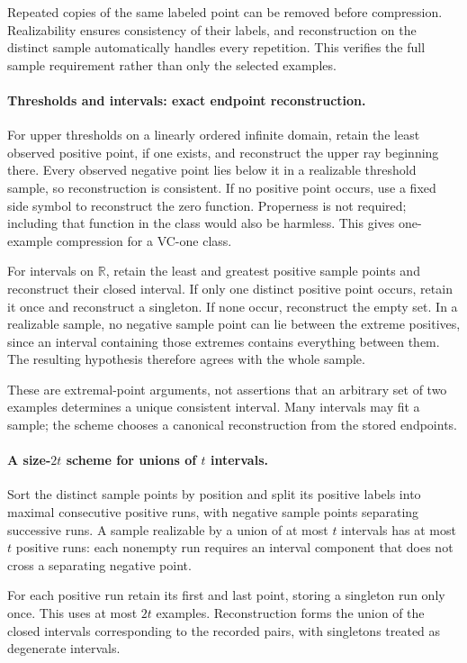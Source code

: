 \documentclass[11pt]{article}
\begin{document}
Repeated copies of the same labeled point can be removed before compression. Realizability ensures consistency of their labels, and reconstruction on the distinct sample automatically handles every repetition. This verifies the full sample requirement rather than only the selected examples.

\paragraph{Thresholds and intervals: exact endpoint reconstruction.}
For upper thresholds on a linearly ordered infinite domain, retain the least observed positive point, if one exists, and reconstruct the upper ray beginning there. Every observed negative point lies below it in a realizable threshold sample, so reconstruction is consistent. If no positive point occurs, use a fixed side symbol to reconstruct the zero function. Properness is not required; including that function in the class would also be harmless. This gives one-example compression for a VC-one class.

For intervals on $\mathbb R$, retain the least and greatest positive sample points and reconstruct their closed interval. If only one distinct positive point occurs, retain it once and reconstruct a singleton. If none occur, reconstruct the empty set. In a realizable sample, no negative sample point can lie between the extreme positives, since an interval containing those extremes contains everything between them. The resulting hypothesis therefore agrees with the whole sample.

These are extremal-point arguments, not assertions that an arbitrary set of two examples determines a unique consistent interval. Many intervals may fit a sample; the scheme chooses a canonical reconstruction from the stored endpoints.

\paragraph{A size-$2t$ scheme for unions of $t$ intervals.}
Sort the distinct sample points by position and split its positive labels into maximal consecutive positive runs, with negative sample points separating successive runs. A sample realizable by a union of at most $t$ intervals has at most $t$ positive runs: each nonempty run requires an interval component that does not cross a separating negative point.

For each positive run retain its first and last point, storing a singleton run only once. This uses at most $2t$ examples. Reconstruction forms the union of the closed intervals corresponding to the recorded pairs, with singletons treated as degenerate intervals.
\end{document}
